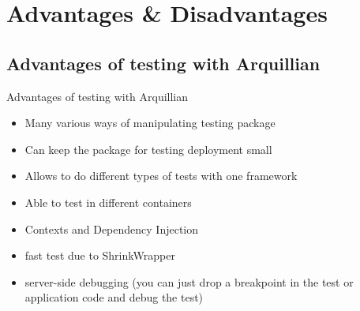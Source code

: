 \section[Advantages \& Disadvantages]{Advantages \& Disadvantages}
\subsection{Advantages of testing with Arquillian}
\begin{frame}{Advantages of testing with Arquillian}
  \begin{itemize}
  \item Many various ways of manipulating testing package
  \item Can keep the package for testing deployment small
  \item Allows to do different types of tests with one framework
  \item Able to test in different containers
  \item Contexts and Dependency Injection 
  \item fast test due to ShrinkWrapper
  \item server-side debugging (you can just drop a breakpoint in the test or 			application code and debug the test)
  \end{itemize}
\end{frame}

